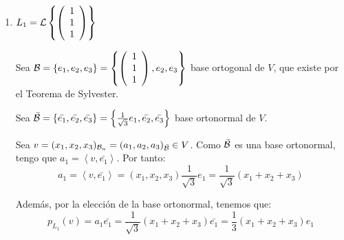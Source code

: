 \begin{ejercicio}
\begin{enumerate}
    \begin{enumerate}
        \item $L_1=\mathcal{L}\left\{\left(\begin{array}{c} \label{Ej1.2.a_Recta111}
             1 \\ 1 \\ 1
        \end{array}\right)\right\}$

        Sea $\mathcal{B}=\{e_1, e_2, e_3\}=\left\{
                \left(\begin{array}{c}
                     1 \\ 1 \\ 1
                \end{array}\right),e_2, e_3\right\}$
        base ortogonal de $V$, que existe por el Teorema de Sylvester.
        
        Sea $\bar{\mathcal{B}}=\{\bar{e_1}, \bar{e_2}, \bar{e_3}\}= \left\{
            \frac{1}{\sqrt{3}}e_1,
            \bar{e_2}, \bar{e_3}
            \right\}$ base ortonormal de $V$.
        
        Sea $v=(x_1, x_2, x_3)_{\mathcal{B}_u}=(a_1, a_2, a_3)_{\bar{\mathcal{B}}}\in V$. Como $\bar{\mathcal{B}}$ es una base ortonormal, tengo que $a_1 = \left<v, \bar{e_1}\right>$. Por tanto:
        \begin{equation*}
            a_1 = \left<v, \bar{e_1}\right> = (x_1, x_2, x_3) \frac{1}{\sqrt{3}} e_1
            = \frac{1}{\sqrt{3}}(x_1 + x_2 + x_3)
        \end{equation*}
        
        Además, por la elección de la base ortonormal, tenemos que:
        \begin{equation*}
            p_{L_1}(v)=a_1\bar{e_1}= \frac{1}{\sqrt{3}}(x_1 + x_2 + x_3)\bar{e_1}
            = \frac{1}{3}(x_1 + x_2 + x_3)e_1
        \end{equation*}


\end{enumerate}
\end{enumerate}
\end{ejercicio}
